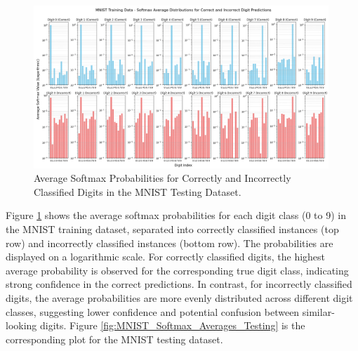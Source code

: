 
\begin{figure}[ht]
    \centering
    \includegraphics[width=0.99\textwidth]{Figures/MNIST_Softmax_Averages_Training.png}
    \caption{Average Softmax Probabilities for Correctly and Incorrectly Classified Digits in the MNIST Testing Dataset.}
    \label{fig:MNIST_Softmax_Averages_Training}
\end{figure}

Figure \ref{fig:MNIST_Softmax_Averages_Training} shows the average softmax probabilities for each digit class (0 to 9) in the MNIST training dataset, separated into correctly classified instances (top row) and incorrectly classified instances (bottom row). The probabilities are displayed on a logarithmic scale. For correctly classified digits, the highest average probability is observed for the corresponding true digit class, indicating strong confidence in the correct predictions. In contrast, for incorrectly classified digits, the average probabilities are more evenly distributed across different digit classes, suggesting lower confidence and potential confusion between similar-looking digits.
Figure \ref{fig:MNIST_Softmax_Averages_Testing} is the corresponding plot for the MNIST testing dataset.

